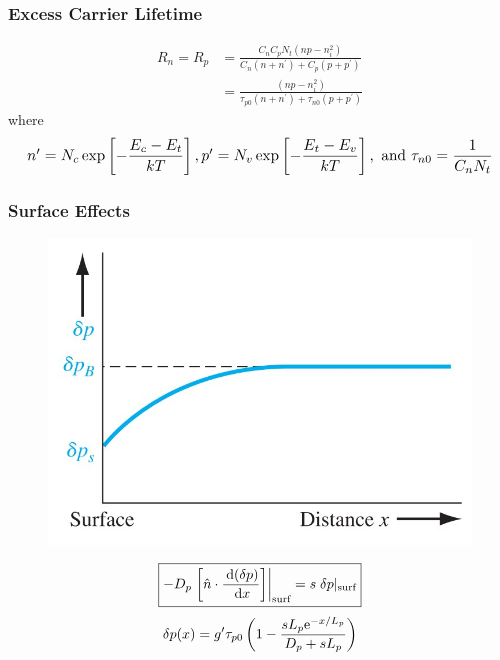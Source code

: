 \documentclass{beamer}
\begin{document}
    \begin{frame} \frametitle{Excess Carrier Lifetime}
        \begin{equation*}
            \boxed{
                \begin{aligned}
                    R_n = R_p &= \frac{C_n C_p N_t (np - n_i^2)}{C_n (n + n^\prime) + C_p(p + p^\prime)} \\
                    &= \frac{(np - n_i^2)}{\tau_{p0}(n + n^\prime) + \tau_{n0} (p + p^\prime) } 
                \end{aligned}
                }
        \end{equation*}
        where 
        \begin{equation*}
            \resizebox*{\textwidth}{!}{ %
                $n^\prime = N_c \exp\left[ - \dfrac{E_c - E_t}{kT}  \right], p^\prime = N_v \exp \left[ - \dfrac{E_t - E_v}{kT}  \right], \text{ and } \tau_{n0} = \dfrac{1}{C_n N_t}$
            }
        \end{equation*}
    \end{frame}

    \begin{frame} \frametitle{Surface Effects}
        \begin{figure}[H]
            \centering
            \includegraphics[width=0.6\linewidth]{Suerface-concentration.jpg}
            \label{fig:Suerface-concentration.jpg}
        \end{figure}
        \begin{equation*}
            \begin{aligned}
                \boxed{- D_p \left. \left[ \hat{n} \cdot \frac{\: \mathrm{d} (\delta p)}{\: \mathrm{d} x}  \right] \right|_{\text{surf}} = s \; \delta p |_{\text{surf}}}
            \end{aligned}
        \end{equation*}
        \begin{equation*}
            \begin{aligned}
                \delta p(x) = g^\prime \tau_{p0} \left( 1 - \frac{sL_p\mathrm{e}^{-x/L_p} }{D_p + sL_p}  \right)
            \end{aligned}
        \end{equation*}
    \end{frame}
\end{document}
